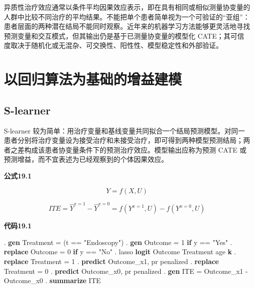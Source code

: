 \documentclass[
  chinese-hans,
  letterpaper,
  DIV=11,
  numbers=noendperiod]{scrreprt}
\newenvironment{Shaded}{\begin{snugshade}}{\end{snugshade}}
\newcommand{\FunctionTok}[1]{\textcolor[rgb]{0.28,0.35,0.67}{#1}}
\newcommand{\KeywordTok}[1]{\textcolor[rgb]{0.00,0.23,0.31}{\textbf{#1}}}
\newcommand{\NormalTok}[1]{\textcolor[rgb]{0.00,0.23,0.31}{#1}}
\newcommand{\StringTok}[1]{\textcolor[rgb]{0.13,0.47,0.30}{#1}}
\begin{document}
异质性治疗效应通常以条件平均因果效应表示，即在具有相同或相似测量协变量的人群中比较不同治疗的平均结果。不能把单个患者简单视为一个可验证的``亚组''：患者层面的两种潜在结局不能同时观察。近年来的机器学习方法能够更灵活地寻找预测变量和交互模式，但其输出仍是基于已测量协变量的模型化
CATE；其可信度取决于随机化或无混杂、可交换性、阳性性、模型稳定性和外部验证。

\section{以回归算法为基础的增益建模}\label{ux4ee5ux56deux5f52ux7b97ux6cd5ux4e3aux57faux7840ux7684ux589eux76caux5efaux6a21}

\subsection{S-learner}\label{s-learner}

S-learner
较为简单：用治疗变量和基线变量共同拟合一个结局预测模型。对同一患者分别将治疗变量设为接受治疗和未接受治疗，即可得到两种模型预测结局；两者之差构成该患者协变量条件下的预测治疗效应。模型输出应称为预测
CATE 或预测增益，而不宜表述为已经观察到的个体因果效应。

\textbf{公式19.1}

\[
Y=f(X,U)
\]

\[
ITE=\widehat{Y}^{x=1}-\widehat{Y}^{x=0}=f\left(Y^{x=1},U\right)-f\left(Y^{x=0},U\right)
\]

\begin{tcolorbox}[enhanced jigsaw, arc=.35mm, bottomrule=.15mm, breakable, colback=white, colframe=quarto-callout-note-color-frame, left=2mm, leftrule=.75mm, opacityback=0, rightrule=.15mm, toprule=.15mm]

\vspace{-3mm}\textbf{代码19.1}\vspace{3mm}

\begin{Shaded}
\begin{Highlighting}[]
\NormalTok{. }\KeywordTok{gen}\NormalTok{ Treatment = (t == }\StringTok{"Endoscopy"}\NormalTok{)}
\NormalTok{. }\KeywordTok{gen}\NormalTok{ Outcome = 1 }\KeywordTok{if} \FunctionTok{y}\NormalTok{ == }\StringTok{"Yes"}
\NormalTok{. }\KeywordTok{replace}\NormalTok{ Outcome = 0 }\KeywordTok{if} \FunctionTok{y}\NormalTok{ == }\StringTok{"No"}
\NormalTok{. lasso }\KeywordTok{logit}\NormalTok{ Outcome Treatment age }\KeywordTok{k}
\NormalTok{. }\KeywordTok{replace}\NormalTok{ Treatment = 1}
\NormalTok{. }\KeywordTok{predict}\NormalTok{ Outcome\_x1, pr penalized}
\NormalTok{. }\KeywordTok{replace}\NormalTok{ Treatment = 0}
\NormalTok{. }\KeywordTok{predict}\NormalTok{ Outcome\_x0, pr penalized}
\NormalTok{. }\KeywordTok{gen}\NormalTok{ ITE = Outcome\_x1 {-} Outcome\_x0}
\NormalTok{. }\KeywordTok{summarize}\NormalTok{ ITE}
\end{Highlighting}
\end{Shaded}

\end{tcolorbox}
\end{document}
